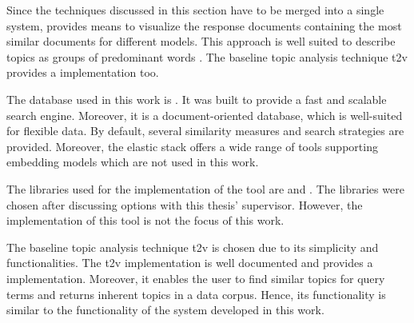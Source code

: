 Since the techniques discussed in this section have to be merged into a single system, 
\wordcloud{} provides means to visualize the response documents containing the most similar documents for different models.
This approach is well suited to describe topics as groups of predominant words \cite{topic_modeling2019}.
The baseline topic analysis technique \ac{t2v} provides a \wordcloud{} implementation too.

The database used in this work is \databaseName{}.
It was built to provide a fast and scalable search engine.
Moreover, it is a document-oriented database, which is well-suited for flexible data.
By default, several similarity measures and search strategies are provided.
Moreover, the elastic stack offers a wide range of tools supporting embedding models which are not used in this work.


The libraries used for the implementation of the tool are \angular{} and \flask{}.
The libraries were chosen after discussing options with this thesis' supervisor.
However, the implementation of this tool is not the focus of this work.

The baseline topic analysis technique \ac{t2v} is chosen due to its simplicity and functionalities.
The \ac{t2v} implementation is well documented and provides a \wordcloud{} implementation.
Moreover, it enables the user to find similar topics for query terms and returns inherent topics in a data corpus.
Hence, its functionality is similar to the functionality of the system developed in this work.